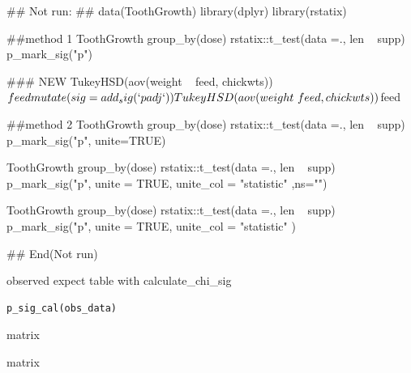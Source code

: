 \documentclass[a4paper]{book}
\begin{document}
\begin{Examples}
\begin{ExampleCode}

\#\# Not run: 
## data(ToothGrowth)
library(dplyr)
library(rstatix)

##method 1
 ToothGrowth %
  group_by(dose) %
  rstatix::t_test(data =., len ~ supp) %
  p_mark_sig("p")

  ### NEW
  TukeyHSD(aov(weight ~ feed, chickwts))$feed %
  mutate(sig = add_sig(`p adj`))

  TukeyHSD(aov(weight ~ feed, chickwts))$feed %


##method 2
 ToothGrowth %
 group_by(dose) %
 rstatix::t_test(data =., len ~ supp) %
  p_mark_sig("p", unite=TRUE)


 ToothGrowth %
     group_by(dose) %
    rstatix::t_test(data =., len ~ supp) %
    p_mark_sig("p", unite = TRUE, unite_col = "statistic" ,ns="")

 ToothGrowth %
   group_by(dose) %
   rstatix::t_test(data =., len ~ supp) %
   p_mark_sig("p", unite = TRUE, unite_col = "statistic" )

## End(Not run)


\end{ExampleCode}
\end{Examples}

%
\begin{Description}
observed expect table with calculate\_chi\_sig
\end{Description}
%
\begin{Usage}
\begin{verbatim}
p_sig_cal(obs_data)
\end{verbatim}
\end{Usage}
%
\begin{Arguments}
\begin{ldescription}
\item[\code{obs\_data}] matrix
\end{ldescription}
\end{Arguments}
%
\begin{Value}
matrix
\end{Value}
\end{document}

